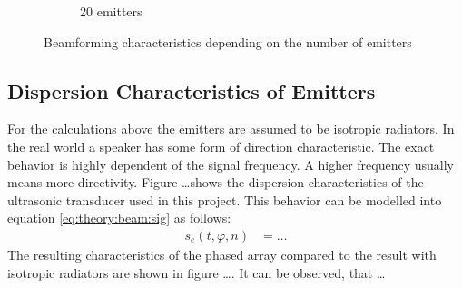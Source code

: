 \begin{figure}[ht]
\begin{subfigure}[b]{0.32\textwidth}
    \caption{20 emitters}
    \label{fig:theory:beam:num_20}
  \end{subfigure}
  \caption{Beamforming characteristics depending on the number of emitters}
  \label{fig:theory:beam:num}
\end{figure}
%
\subsection{Dispersion Characteristics of Emitters}
For the calculations above the emitters are assumed to be isotropic radiators. In the real world a speaker has some form of direction characteristic. The exact behavior is highly dependent of the signal frequency. A higher frequency usually means more directivity.\p
%
Figure \dots shows the dispersion characteristics of the ultrasonic transducer used in this project. This behavior can be modelled into equation \ref{eq:theory:beam:sig} as follows:
%
\begin{align}
  s_e(t, \varphi, n) &= \dots
\end{align}
%
The resulting characteristics of the phased array compared to the result with isotropic radiators are shown in figure \dots. It can be observed, that \dots